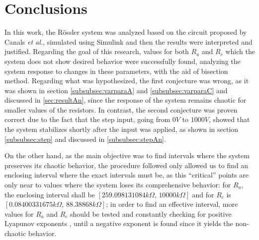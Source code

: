 \section{Conclusions}\label{sec:conc}
    In this work, the Rössler system was analyzed based on the circuit proposed by Canals \textit{et al.}, simulated using Simulink and then the results were interpreted and justified. Regarding the goal of this research, values for both $R_a$ and $R_c$ which the system does not show desired behavior were successfully found, analyzing the system response to changes in these parameters, with the aid of bisection method. Regarding what was hypothesized, the first conjecture was wrong, as it was shown in section \ref{subsubsec:varparaA} and \ref{subsubsec:varparaC} and discussed in \ref{sec:resultAn}, since the response of the system remains chaotic for smaller values of the resistors. In contrast, the second conjecture was proven correct due to the fact that the step input, going from $0V$ to $1000V$, showed that the system stabilizes shortly after the input was applied, as shown in section \ref{subsubsec:step} and discussed in \ref{subsubsec:stepAn}.
    
    On the other hand, as the main objective was to find intervals where the system preserves its chaotic behavior, the procedure followed only allowed us to find an enclosing interval where the exact intervals must be, as this ``critical'' points are only near to values where the system loses its comprehensive behavior: for $R_a$, the enclosing interval shall be $[259.098131084k\Omega,\,10000k\Omega]$ and for $R_c$ is $[0.08400331675k\Omega,\,88.38868k\Omega]$; in order to find an effective interval, more values for $R_a$ and $R_c$ should be tested and constantly checking for positive Lyapunov exponents \cite{lyapunov}, until a negative exponent is found since it yields the non-chaotic behavior.
    